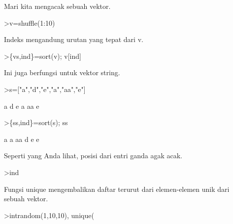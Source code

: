 \documentclass[a4paper,10pt]{article}
\begin{document}
\begin{eulernotebook}
\begin{eulercomment}
\begin{eulercomment}
\begin{eulercomment}
\begin{eulercomment}
\begin{eulercomment}
\begin{eulercomment}
\begin{eulercomment}
\begin{eulercomment}
\begin{eulercomment}
Mari kita mengacak sebuah vektor.
\end{eulercomment}
\begin{eulerprompt}
>v=shuffle(1:10)
\end{eulerprompt}
\begin{euleroutput}
  [5,  9,  10,  1,  3,  8,  7,  4,  6,  2]
\end{euleroutput}
\begin{eulercomment}
Indeks mengandung urutan yang tepat dari v.
\end{eulercomment}
\begin{eulerprompt}
>\{vs,ind\}=sort(v); v[ind]
\end{eulerprompt}
\begin{euleroutput}
  [1,  2,  3,  4,  5,  6,  7,  8,  9,  10]
\end{euleroutput}
\begin{eulercomment}
Ini juga berfungsi untuk vektor string.
\end{eulercomment}
\begin{eulerprompt}
>s=["a","d","e","a","aa","e"]
\end{eulerprompt}
\begin{euleroutput}
  a
  d
  e
  a
  aa
  e
\end{euleroutput}
\begin{eulerprompt}
>\{ss,ind\}=sort(s); ss
\end{eulerprompt}
\begin{euleroutput}
  a
  a
  aa
  d
  e
  e
\end{euleroutput}
\begin{eulercomment}
Seperti yang Anda lihat, posisi dari entri ganda agak acak.
\end{eulercomment}
\begin{eulerprompt}
>ind
\end{eulerprompt}
\begin{euleroutput}
  [4,  1,  5,  2,  6,  3]
\end{euleroutput}
\begin{eulercomment}
Fungsi unique mengembalikan daftar terurut dari elemen-elemen unik
dari sebuah vektor.
\end{eulercomment}
\begin{eulerprompt}
>intrandom(1,10,10), unique(%
\end{eulerprompt}
\begin{euleroutput}
  [5,  8,  5,  2,  7,  10,  4,  4,  2,  1]
  [1,  2,  4,  5,  7,  8,  10]
\end{euleroutput}
\begin{eulercomment}

\end{eulercomment}
\end{eulercomment}
\end{eulercomment}
\end{eulercomment}
\end{eulercomment}
\end{eulercomment}
\end{eulercomment}
\end{eulercomment}
\end{eulercomment}
\end{eulernotebook}
\end{document}
